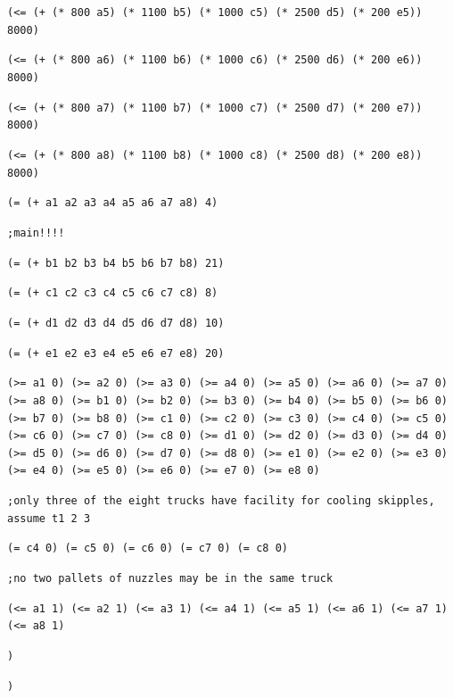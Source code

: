 \documentclass[12pt]{article}
\begin{document}
{{\tt  (<= (+ (* 800 a5) (* 1100 b5) (* 1000 c5) (* 2500 d5) (* 200 e5)) 8000) }

{\tt  (<= (+ (* 800 a6) (* 1100 b6) (* 1000 c6) (* 2500 d6) (* 200 e6)) 8000) }

{\tt  (<= (+ (* 800 a7) (* 1100 b7) (* 1000 c7) (* 2500 d7) (* 200 e7)) 8000) }

{\tt  (<= (+ (* 800 a8) (* 1100 b8) (* 1000 c8) (* 2500 d8) (* 200 e8)) 8000) }

{\tt  (= (+ a1 a2 a3 a4 a5 a6 a7 a8) 4) }

{\tt  ;main!!!! }

{\tt  (= (+ b1 b2 b3 b4 b5 b6 b7 b8) 21) }

{\tt  (= (+ c1 c2 c3 c4 c5 c6 c7 c8) 8) }

{\tt  (= (+ d1 d2 d3 d4 d5 d6 d7 d8) 10) }

{\tt  (= (+ e1 e2 e3 e4 e5 e6 e7 e8) 20) }

{\tt  (>= a1 0) (>= a2 0) (>= a3 0) (>= a4 0) (>= a5 0) (>= a6 0) (>= a7 0) (>= a8 0) (>= b1 0) (>= b2 0) (>= b3 0) (>= b4 0) (>= b5 0) (>= b6 0) (>= b7 0) (>= b8 0) (>= c1 0) (>= c2 0) (>= c3 0) (>= c4 0) (>= c5 0) (>= c6 0) (>= c7 0) (>= c8 0) (>= d1 0) (>= d2 0) (>= d3 0) (>= d4 0) (>= d5 0) (>= d6 0) (>= d7 0) (>= d8 0) (>= e1 0) (>= e2 0) (>= e3 0) (>= e4 0) (>= e5 0) (>= e6 0) (>= e7 0) (>= e8 0) }

{\tt  ;only three of the eight trucks have facility for cooling skipples, assume t1 2 3 }

{\tt  (= c4 0) (= c5 0) (= c6 0) (= c7 0) (= c8 0) }

{\tt  ;no two pallets of nuzzles may be in the same truck }

{\tt  (<= a1 1) (<= a2 1) (<= a3 1) (<= a4 1) (<= a5 1) (<= a6 1) (<= a7 1) (<= a8 1) }

{\tt  ) }

{\tt   }

{\tt   }

{\tt  ) }

}
\end{document}
